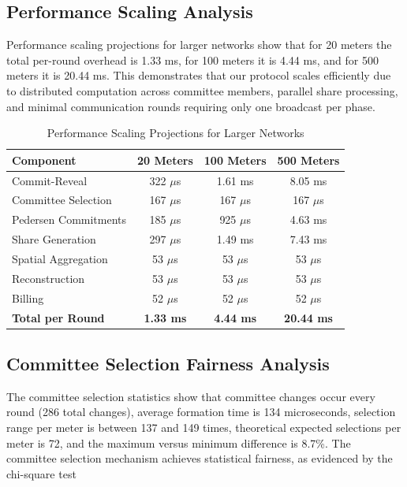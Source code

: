 \documentclass[conference]{IEEEtran}
\begin{document}
\subsection{Performance Scaling Analysis}

Performance scaling projections for larger networks show that for 20 meters the total per-round overhead is 1.33 ms, for 100 meters it is 4.44 ms, and for 500 meters it is 20.44 ms. This demonstrates that our protocol scales efficiently due to distributed computation across committee members, parallel share processing, and minimal communication rounds requiring only one broadcast per phase.

\begin{table}[h]
\centering
\caption{Performance Scaling Projections for Larger Networks}
\label{tab:scaling}
\begin{tabular}{|l|c|c|c|}
\hline
\textbf{Component} & \textbf{20 Meters} & \textbf{100 Meters} & \textbf{500 Meters} \\
\hline
Commit-Reveal & 322 $\mu$s & 1.61 ms & 8.05 ms \\
Committee Selection & 167 $\mu$s & 167 $\mu$s & 167 $\mu$s \\
Pedersen Commitments & 185 $\mu$s & 925 $\mu$s & 4.63 ms \\
Share Generation & 297 $\mu$s & 1.49 ms & 7.43 ms \\
Spatial Aggregation & 53 $\mu$s & 53 $\mu$s & 53 $\mu$s \\
Reconstruction & 53 $\mu$s & 53 $\mu$s & 53 $\mu$s \\
Billing & 52 $\mu$s & 52 $\mu$s & 52 $\mu$s \\
\hline
\textbf{Total per Round} & \textbf{1.33 ms} & \textbf{4.44 ms} & \textbf{20.44 ms} \\
\hline
\end{tabular}
\end{table}

\subsection{Committee Selection Fairness Analysis}

The committee selection statistics show that committee changes occur every round (286 total changes), average formation time is 134 microseconds, selection range per meter is between 137 and 149 times, theoretical expected selections per meter is 72, and the maximum versus minimum difference is 8.7\%. The committee selection mechanism achieves statistical fairness, as evidenced by the chi-square test
\end{document}
